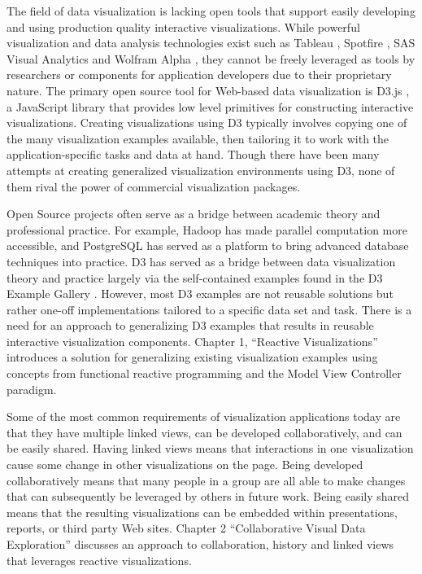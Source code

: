 The field of data visualization is lacking open tools that support easily developing and using production quality interactive visualizations. While powerful visualization and data analysis technologies exist such as Tableau \cite{hanrahan2007visual}, Spotfire \cite{spotfire}, SAS Visual Analytics \cite{sas2012sas} and Wolfram Alpha \cite{wolframAlpha}, they cannot be freely leveraged as tools by researchers or components for application developers due to their proprietary nature. The primary open source tool for Web-based data visualization is D3.js \cite{d3}, a JavaScript library that provides low level primitives for constructing interactive visualizations. Creating visualizations using D3 typically involves copying one of the many visualization examples available, then tailoring it to work with the application-specific tasks and data at hand. Though there have been many attempts at creating generalized visualization environments using D3, none of them rival the power of commercial visualization packages.

Open Source projects often serve as a bridge between academic theory and professional practice. For example, Hadoop has made parallel computation more accessible, and PostgreSQL has served as a platform to bring advanced database techniques into practice. D3 has served as a bridge between data visualization theory and practice largely via the self-contained examples found in the D3 Example Gallery \cite{d3examples}. However, most D3 examples are not reusable solutions but rather one-off implementations tailored to a specific data set and task. There is a need for an approach to generalizing D3 examples that results in reusable interactive visualization components. Chapter 1, ``Reactive Visualizations'' introduces a solution for generalizing existing visualization examples using concepts from functional reactive programming and the Model View Controller paradigm.

Some of the most common requirements of visualization applications today are that they have multiple linked views, can be developed collaboratively, and can be easily shared. Having linked views means that interactions in one visualization cause some change in other visualizations on the page. Being developed collaboratively means that many people in a group are all able to make changes that can subsequently be leveraged by others in future work. Being easily shared means that the resulting visualizations can be embedded within presentations, reports, or third party Web sites. Chapter 2 ``Collaborative Visual Data Exploration'' discusses an approach to collaboration, history and linked views that leverages reactive visualizations.

